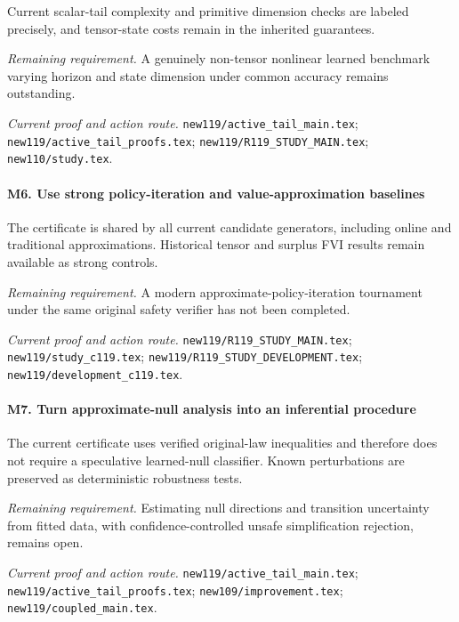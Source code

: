 Current scalar-tail complexity and primitive dimension checks are labeled precisely, and tensor-state costs remain in the inherited guarantees.

\par\emph{Remaining requirement.} A genuinely non-tensor nonlinear learned benchmark varying horizon and state dimension under common accuracy remains outstanding.

\par\emph{Current proof and action route.} \nolinkurl{new119/active_tail_main.tex}; \nolinkurl{new119/active_tail_proofs.tex}; \nolinkurl{new119/R119_STUDY_MAIN.tex}; \nolinkurl{new110/study.tex}.

\paragraph{M6. Use strong policy-iteration and value-approximation baselines}

The certificate is shared by all current candidate generators, including online and traditional approximations. Historical tensor and surplus FVI results remain available as strong controls.

\par\emph{Remaining requirement.} A modern approximate-policy-iteration tournament under the same original safety verifier has not been completed.

\par\emph{Current proof and action route.} \nolinkurl{new119/R119_STUDY_MAIN.tex}; \nolinkurl{new119/study_c119.tex}; \nolinkurl{new119/R119_STUDY_DEVELOPMENT.tex}; \nolinkurl{new119/development_c119.tex}.

\paragraph{M7. Turn approximate-null analysis into an inferential procedure}

The current certificate uses verified original-law inequalities and therefore does not require a speculative learned-null classifier. Known perturbations are preserved as deterministic robustness tests.

\par\emph{Remaining requirement.} Estimating null directions and transition uncertainty from fitted data, with confidence-controlled unsafe simplification rejection, remains open.

\par\emph{Current proof and action route.} \nolinkurl{new119/active_tail_main.tex}; \nolinkurl{new119/active_tail_proofs.tex}; \nolinkurl{new109/improvement.tex}; \nolinkurl{new119/coupled_main.tex}.


